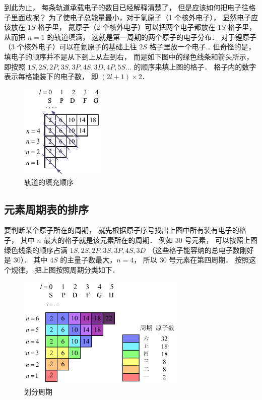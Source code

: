到此为止， 每条轨道承载电子的数目已经解释清楚了， 但是应该如何把电子往格子里面放呢？ 为了使电子总能量最小，对于氢原子（1 个核外电子）， 显然电子应该放在 $1S$ 格子里， 氦原子（2 个核外电子）可以把两个电子都放在 $1S$ 格子里， 从而把 $n=1$ 的轨道填满， 这就是第一周期的两个原子的电子分布． 对于锂原子（3 个核外电子）可以在氦原子的基础上往 $2S$ 格子里放一个电子… 但奇怪的是， 填电子的顺序并不是从下到上从左到右， 而是如下图中的绿色线条和箭头所示， 即按照 $1S, 2S, 2P, 3S, 3P, 4S, 3D, 4P, 5S…$ 的顺序来填上图的格子． 格子内的数字表示每格能装下的电子数， 即 $(2l + 1) \times 2$．
\begin{figure}[ht]
\centering
\includegraphics[width=4cm]{./figures/Ptable3.pdf}
\caption{轨道的填充顺序} 
\end{figure}

\subsection{元素周期表的排序}

要判断某个原子所在的周期， 就先根据原子序号找出上图中所有装有电子的格子， 其中 $n$ 最大的格子就是该元素所在的周期． 例如 30 号元素， 可以按照上图绿色线条的顺序占满 $1S, 2S, 2P, 3S, 3P, 4S, 3D$ （这些格子能容纳的总电子数刚好是 30）． 其中 $4S$ 的主量子数最大，$n=4$， 所以 30 号元素在第四周期． 按照这个规律， 把上图按照周期分类如下．
\begin{figure}[ht]
\centering
\includegraphics[width=8cm]{./figures/Ptable4.pdf}
\caption{划分周期} 
\end{figure}

